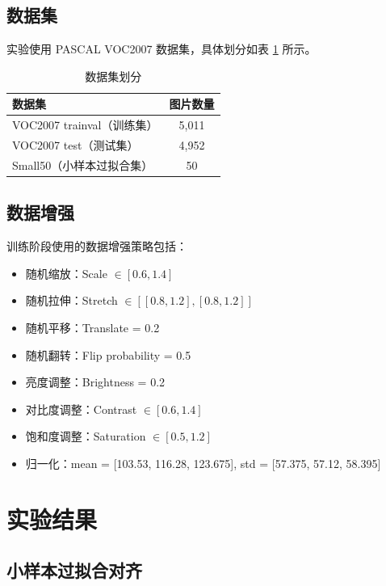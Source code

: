 \documentclass[12pt,a4paper]{article}
\begin{document}
\subsection{数据集}

实验使用 PASCAL VOC2007 数据集，具体划分如表 \ref{tab:dataset} 所示。

\begin{table}[H]
\centering
\caption{数据集划分}
\label{tab:dataset}
\begin{tabular}{lc}
\toprule
\textbf{数据集} & \textbf{图片数量} \\
\midrule
VOC2007 trainval（训练集） & 5,011 \\
VOC2007 test（测试集） & 4,952 \\
Small50（小样本过拟合集） & 50 \\
\bottomrule
\end{tabular}
\end{table}

\subsection{数据增强}

训练阶段使用的数据增强策略包括：
\begin{itemize}
    \item 随机缩放：Scale $\in [0.6, 1.4]$
    \item 随机拉伸：Stretch $\in [[0.8, 1.2], [0.8, 1.2]]$
    \item 随机平移：Translate = 0.2
    \item 随机翻转：Flip probability = 0.5
    \item 亮度调整：Brightness = 0.2
    \item 对比度调整：Contrast $\in [0.6, 1.4]$
    \item 饱和度调整：Saturation $\in [0.5, 1.2]$
    \item 归一化：mean = [103.53, 116.28, 123.675], std = [57.375, 57.12, 58.395]
\end{itemize}

\section{实验结果}

\subsection{小样本过拟合对齐}
\end{document}

